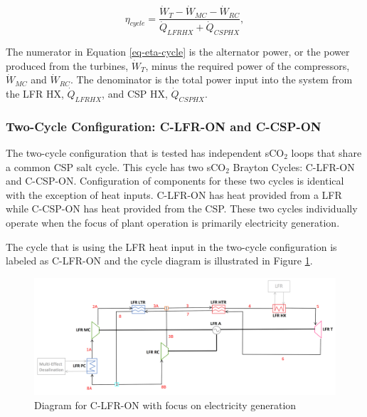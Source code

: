\begin{paracol}{2}
\begin{equation}
    \label{eq-eta-cycle}
    \eta_{cycle} = \frac{\dot{W}_{T}-\dot{W}_{MC}-\dot{W}_{RC}}{\dot{Q}_{LFRHX}+\dot{Q}_{CSPHX}},
\end{equation}

The numerator in Equation \ref{eq-eta-cycle} is the alternator power, or the power produced from the turbines, $\dot{W}_{T}$, minus the required power of the compressors, $\dot{W}_{MC}$ and $\dot{W}_{RC}$. The denominator is the total power input into the system from the LFR HX, $\dot{Q}_{LFRHX}$, and CSP HX, $\dot{Q}_{CSPHX}$.


\subsubsection{Two-Cycle Configuration: C-LFR-ON and C-CSP-ON} %

The two-cycle configuration that is tested has independent sCO$_{2}$ loops that share a common CSP salt cycle. This cycle has two sCO$_{2}$ Brayton Cycles: C-LFR-ON and C-CSP-ON. Configuration of components for these two cycles is identical with the exception of heat inputs. C-LFR-ON has heat provided from a LFR while C-CSP-ON has heat provided from the CSP. These two cycles individually operate when the focus of plant operation is primarily electricity generation. 
    
The cycle that is using the LFR heat input in the two-cycle configuration is labeled as C-LFR-ON and the cycle diagram is illustrated in Figure \ref{c-lfr-on}. 

\begin{figure}[H] 
    \widefigure
    \includegraphics[width=\linewidth]{Definitions/c-lfr-on.pdf}
    \caption{Diagram for C-LFR-ON with focus on electricity generation\label{c-lfr-on}}
\end{figure}


\end{paracol}
